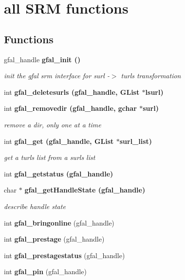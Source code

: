 \section{all SRM functions}
\label{group__srm__group}
\subsection*{Functions}
\begin{CompactItemize}
\item 
gfal\_\-handle \bf{gfal\_\-init} ()\label{group__srm__group_g4e6d4aab98935aaf408d8a5cdf9727d4}

\begin{CompactList}\small\item\em init the gfal srm interface for surl -$>$ turls transformation \item\end{CompactList}\item 
int \bf{gfal\_\-deletesurls} (gfal\_\-handle, GList $\ast$lsurl)
\item 
int \bf{gfal\_\-removedir} (gfal\_\-handle, gchar $\ast$surl)\label{group__srm__group_gff1cd1d3df193f577ebb2fe108aa0b6c}

\begin{CompactList}\small\item\em remove a dir, only one at a time \item\end{CompactList}\item 
int \bf{gfal\_\-get} (gfal\_\-handle, GList $\ast$surl\_\-list)
\begin{CompactList}\small\item\em get a turls list from a surls list \item\end{CompactList}\item 
int \bf{gfal\_\-getstatus} (gfal\_\-handle)
\item 
char $\ast$ \bf{gfal\_\-get\-Handle\-State} (gfal\_\-handle)
\begin{CompactList}\small\item\em describe handle state \item\end{CompactList}\item 
int \textbf{gfal\_\-bringonline} (gfal\_\-handle)\label{group__srm__group_g17710c0eaab072ece70a7138b598f0b0}

\item 
int \textbf{gfal\_\-prestage} (gfal\_\-handle)\label{group__srm__group_g05a256007ca8303bbf31c1148cc23995}

\item 
int \textbf{gfal\_\-prestagestatus} (gfal\_\-handle)\label{group__srm__group_g575ef65953139a8439575376437cd2f1}

\item 
int \textbf{gfal\_\-pin} (gfal\_\-handle)\label{group__srm__group_g1b450340e97429bf3eb42078c4626048}

\end{CompactItemize}


